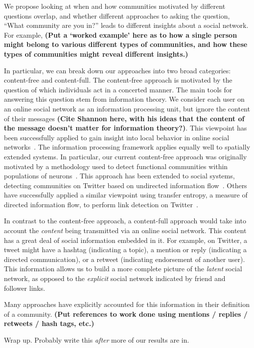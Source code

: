 \documentclass[letterpaper]{article}
\begin{document}
We propose looking at when and how communities motivated by different questions overlap, and whether different approaches to asking the question, ``What community are you in?'' leads to different insights about a social network. For example, \textbf{(Put a `worked example' here as to how a single person might belong to various different types of communities, and how these types of communities might reveal different insights.)}

In particular, we can break down our approaches into two broad categories: content-free and content-full. The content-free approach is motivated by the question of which individuals act in a concerted manner. The main tools for answering this question stem from information theory. We consider each user on an online social network as an information processing unit, but ignore the content of their messages \textbf{(Cite Shannon here, with his ideas that the content of the message doesn't matter for information theory?)}. This viewpoint has been successfully applied to gain insight into local behavior in online social networks~\cite{darmon2013understanding}. The information processing framework applies equally well to spatially extended systems. In particular, our current content-free approach was originally motivated by a methodology used to detect functional communities within populations of neurons~\cite{shalizi2007discovering}. This approach has been extended to social systems, detecting communities on Twitter based on undirected information flow~\cite{darmon2013detecting}. Others have successfully applied a similar viewpoint using transfer entropy, a measure of directed information flow, to perform link detection on Twitter~\cite{ver2012information}.

In contrast to the content-free approach, a content-full approach would take into account the \emph{content} being transmitted via an online social network. This content has a great deal of social information embedded in it. For example, on Twitter, a tweet might have a hashtag (indicating a topic), a mention or reply (indicating a directed communication), or a retweet (indicating endorsement of another user). This information allows us to build a more complete picture of the \emph{latent} social network, as opposed to the \emph{explicit} social network indicated by friend and follower links.

Many approaches have explicitly accounted for this information in their definition of a community. \textbf{(Put references to work done using mentions / replies / retweets / hash tags, etc.)}

Wrap up. Probably write this \emph{after} more of our results are in.
\end{document}
